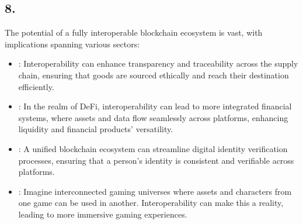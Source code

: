 \documentclass[letterpaper,10pt,english]{jupyterBook}
\begin{document}
\subsection{8. }
\label{\detokenize{Interoperability/Cross-Chain Interoperability:implications-of-a-unified-blockchain-ecosystem}}
\sphinxAtStartPar
The potential of a fully interoperable blockchain ecosystem is vast, with implications spanning various sectors:
\begin{itemize}
\item {} 
\sphinxAtStartPar
{}: Interoperability can enhance transparency and traceability across the supply chain, ensuring that goods are sourced ethically and reach their destination efficiently.

\item {} 
\sphinxAtStartPar
{}: In the realm of DeFi, interoperability can lead to more integrated financial systems, where assets and data flow seamlessly across platforms, enhancing liquidity and financial products’ versatility.

\item {} 
\sphinxAtStartPar
{}: A unified blockchain ecosystem can streamline digital identity verification processes, ensuring that a person’s identity is consistent and verifiable across platforms.

\item {} 
\sphinxAtStartPar
{}: Imagine interconnected gaming universes where assets and characters from one game can be used in another. Interoperability can make this a reality, leading to more immersive gaming experiences.

\end{itemize}
\end{document}
